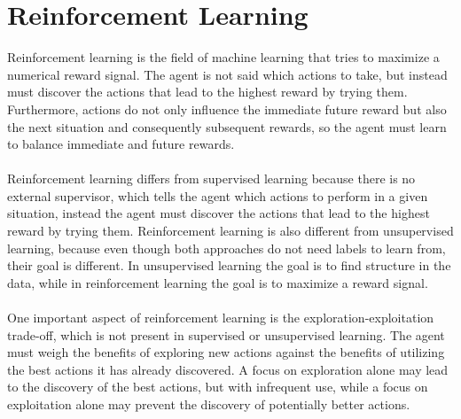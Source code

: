 \section{Reinforcement Learning}
Reinforcement learning is the field of machine learning that tries to maximize a numerical reward signal. The agent is not said which actions to take, but instead must discover the actions that lead to the highest reward by trying them. Furthermore, actions do not only influence the immediate future reward but also the next situation and consequently subsequent rewards, so the agent must learn to balance immediate and future rewards.\\\\
Reinforcement learning differs from supervised learning because there is no external supervisor, which tells the agent which actions to perform in a given situation, instead the agent must discover the actions that lead to the highest reward by trying them. 
Reinforcement learning is also different from unsupervised learning, because even though both approaches do not need labels to learn from, their goal is different. In unsupervised learning the goal is to find structure in the data, while in reinforcement learning the goal is to maximize a reward signal.\\\\
One important aspect of reinforcement learning is the exploration-exploitation trade-off, which is not present in supervised or unsupervised learning. The agent must weigh the benefits of exploring new actions against the benefits of utilizing the best actions it has already discovered. A focus on exploration alone may lead to the discovery of the best actions, but with infrequent use, while a focus on exploitation alone may prevent the discovery of potentially better actions.


